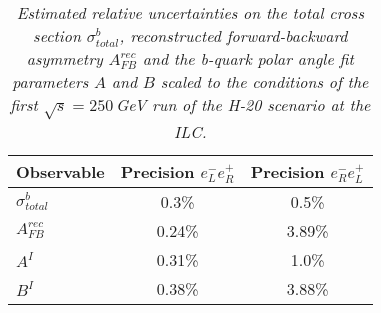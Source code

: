         \begin{table}
        \begin{center}
        \begin{tabular}{l c c}
        \hline
	Observable & Precision $e^-_Le^+_R$ & Precision $e^-_Re^+_L$\\
	\hline
	$\sigma^b_{total} $  & 0.3\%   & 0.5\% \\
	$A_{FB}^{rec} $& 0.24\%  & 3.89\% \\
	$A^I $ 			& 0.31\% & 1.0\% \\
	$B^I $ 			& 0.38\% & 3.88\% \\
		
        \hline
        \end{tabular}
        \end{center}
        \caption{\sl Estimated relative uncertainties on the total cross section $\sigma^b_{total}$, reconstructed forward-backward asymmetry $A_{FB}^{rec}$ and the b-quark polar angle fit parameters $A$ and $B$ scaled to the conditions of the first $\sqrt{s}=250$\,GeV run of the H-20 scenario at the ILC. }
        \label{table:bbbarfinal}
        \end{table}
